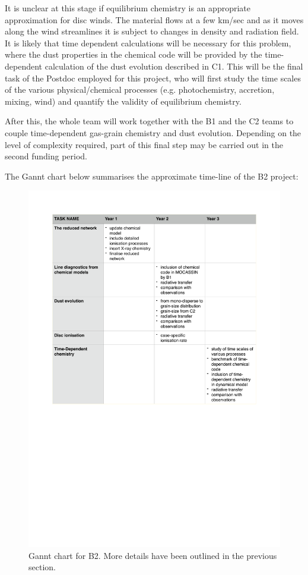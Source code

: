 \documentclass[10pt,fleqn,twoside]{article}
\begin{document}
 It is unclear at this stage if equilibrium chemistry is an appropriate approximation for disc winds. The material flows at a few km/sec and as it moves along the wind streamlines it is subject to changes in density and radiation field. It is likely that time  dependent calculations will be necessary for this problem, where the dust properties in the chemical code will be provided by the time-dependent calculation of the dust evolution described in C1. This will be the final task of the Postdoc employed for this project, who will first study the time scales of the various physical/chemical processes (e.g. photochemistry, accretion, mixing, wind) and quantify the validity of equilibrium chemistry.

After this, the whole team will work together with the B1 and the C2 teams to couple time-dependent gas-grain chemistry and dust evolution.  Depending on the level of complexity required, part of this final step may be carried out in the second funding period.


The Gannt chart below summarises the approximate time-line of the B2 project: 
 \begin{figure}[ht]
   \centering
   \includegraphics[width=\hsize]{GanntB2.pdf}
  
   \caption{Gannt chart for B2. More details have been outlined in the previous section.}
              \label{FigGam}%
    \end{figure}
\end{document}

